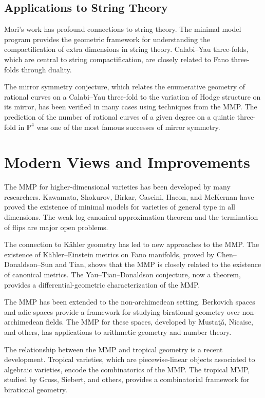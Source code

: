 \subsection*{Applications to String Theory}

Mori's work has profound connections to string theory. The minimal model program
provides the geometric framework for understanding the compactification of
extra dimensions in string theory. Calabi--Yau three-folds, which are central
to string compactification, are closely related to Fano three-folds through
duality.

The mirror symmetry conjecture, which relates the enumerative geometry of
rational curves on a Calabi--Yau three-fold to the variation of Hodge structure
on its mirror, has been verified in many cases using techniques from the MMP.
The prediction of the number of rational curves of a given degree on a quintic
three-fold in $\mathbb{P}^4$ was one of the most famous successes of mirror
symmetry.

\section{Modern Views and Improvements}

The MMP for higher-dimensional varieties has been developed by many researchers.
Kawamata, Shokurov, Birkar, Cascini, Hacon, and McKernan have proved the
existence of minimal models for varieties of general type in all dimensions.
The weak log canonical approximation theorem and the termination of flips are
major open problems.

The connection to K\"ahler geometry has led to new approaches to the MMP. The
existence of K\"ahler--Einstein metrics on Fano manifolds, proved by
Chen--Donaldson--Sun and Tian, shows that the MMP is closely related to the
existence of canonical metrics. The Yau--Tian--Donaldson conjecture, now a
theorem, provides a differential-geometric characterization of the MMP.

The MMP has been extended to the non-archimedean setting. Berkovich spaces and
adic spaces provide a framework for studying birational geometry over
non-archimedean fields. The MMP for these spaces, developed by Musta\c{t}\v{a},
Nicaise, and others, has applications to arithmetic geometry and number theory.

The relationship between the MMP and tropical geometry is a recent development.
Tropical varieties, which are piecewise-linear objects associated to algebraic
varieties, encode the combinatorics of the MMP. The tropical MMP, studied by
Gross, Siebert, and others, provides a combinatorial framework for birational
geometry.

